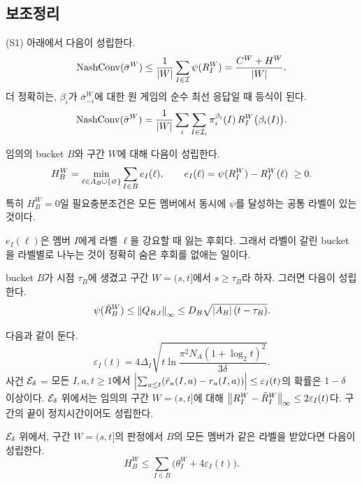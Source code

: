 \subsection{보조정리}
\begin{lemma}[NashConv 분해]\label{lem:decomp}
(S1) 아래에서 다음이 성립한다.
\[
\mathrm{NashConv}(\bar\sigma^W)\le\frac1{\left\lvert W\right\rvert}\sum_{I\in\mathcal{I}}\psi(R_I^W)=\frac{C^W+H^W}{\left\lvert W\right\rvert}.
\]
더 정확히는, $\beta_i$가 $\bar\sigma^W_{-i}$에 대한 원 게임의 순수 최선 응답일 때 등식이 된다.
\[
\mathrm{NashConv}(\bar\sigma^W)=\frac1{\left\lvert W\right\rvert}\sum_i\sum_{I\in\mathcal{I}_i}\pi_i^{\beta_i}(I)\,R_I^W\big(\beta_i(I)\big).
\]
\end{lemma}

\begin{lemma}[라벨 항등식]\label{lem:label}
임의의 bucket $B$와 구간 $W$에 대해 다음이 성립한다.
\[
H_B^W=\min_{\ell\in A_B\cup\{\varnothing\}}\sum_{I\in B}e_I(\ell),\qquad e_I(\ell)=\psi(R_I^W)-R_I^W(\ell)\ \ge0.
\]
특히 $H_B^W=0$일 필요충분조건은 모든 멤버에서 동시에 $\psi$를 달성하는 공통 라벨이 있는 것이다.
\end{lemma}
\noindent $e_I(\ell)$은 멤버 $I$에게 라벨 $\ell$을 강요할 때 잃는 후회다. 그래서 라벨이 갈린 bucket을 라벨별로 나누는 것이 정확히 숨은 후회를 없애는 일이다.

\begin{lemma}[RM+의 구간 상한; 표본 후회]\label{lem:rmplus-window}
bucket $B$가 시점 $\tau_B$에 생겼고 구간 $W=(s,t]$에서 $s\ge\tau_B$라 하자. 그러면 다음이 성립한다.
\[
\psi(\tilde R_B^W)\le\left\lVert Q_{B,t}\right\rVert_\infty\le D_B\sqrt{\left\lvert A_B\right\rvert(t-\tau_B)}.
\]
\end{lemma}

\begin{lemma}[시간 균일 집중]\label{lem:concentration}
다음과 같이 둔다.
\[
\varepsilon_I(t)=4\Delta_I\sqrt{t\ln\frac{\pi^2N_A(1+\log_2t)^2}{3\delta}}.
\]
사건 $\mathcal{E}_\delta$ = {모든 $I,a,t\ge1$에서 $\left\lvert \sum_{u\le t}(\tilde r_u(I,a)-r_u(I,a))\right\rvert\le\varepsilon_I(t)$}의 확률은 $1-\delta$ 이상이다.
$\mathcal{E}_\delta$ 위에서는 임의의 구간 $W=(s,t]$에 대해 $\left\lVert R_I^W-\tilde R_I^W\right\rVert_\infty\le2\varepsilon_I(t)$다. 구간의 끝이 정지시간이어도 성립한다.
\end{lemma}

\begin{lemma}\label{lem:samelabel}
$\mathcal{E}_\delta$ 위에서, 구간 $W=(s,t]$의 판정에서 $B$의 모든 멤버가 같은 라벨을 받았다면 다음이 성립한다.
\[
H_B^W\le\sum_{I\in B}\big(\theta_I^W+4\varepsilon_I(t)\big).
\]
\end{lemma}

